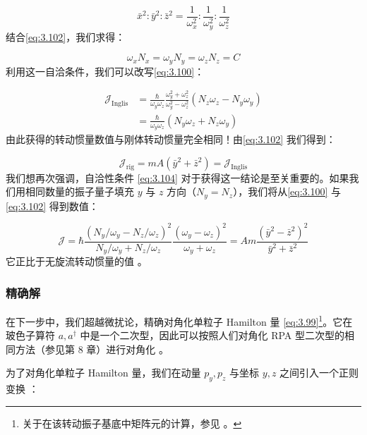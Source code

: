 \begin{equation}
\bar{x}^{2}:\bar{y}^{2}:\bar{z}^{2}=\frac{1}{\omega^{2}_{x}}:\frac{1}{\omega^{2}_{y}}:\frac{1}{\omega^{2}_{z}}\label{eq:3.103}
\end{equation}
结合\ref{eq:3.102}，我们求得：

\begin{equation}
\omega_{x}N_{x}=\omega_{y}N_{y}=\omega_{z}N_{z}=C\label{eq:3.104}
\end{equation}
利用这一自洽条件，我们可以改写\ref{eq:3.100}：

\begin{align}
\mathcal{J}_{\text{Inglis}} & =\frac{\hbar}{\omega_{y}\omega_{z}}\frac{\omega^{2}_{y}+\omega^{2}_{z}}{\omega^{2}_{y}-\omega^{2}_{z}}(N_{z}\omega_{z}-N_{y}\omega_{y})\nonumber \\
 & =\frac{\hbar}{\omega_{y}\omega_{z}}(N_{y}\omega_{z}+N_{z}\omega_{y})\label{eq:3.105}
\end{align}
由此获得的转动惯量数值与刚体转动惯量完全相同！由\ref{eq:3.102} 我们得到：

\begin{equation}
\mathcal{J}_{\text{rig}}=mA\left(\bar{y}^{2}+\bar{z}^{2}\right)=\mathcal{J}_{\text{Inglis}}\label{eq:3.106}
\end{equation}
我们想再次强调，自洽性条件 \ref{eq:3.104} 对于获得这一结论是至关重要的。如果我们用相同数量的振子量子填充 $y$
与 $z$ 方向（$N_{y}=N_{z}$），我们将从\ref{eq:3.100} 与 \ref{eq:3.102} 得到数值：

\begin{equation}
\mathcal{J}=\hbar\frac{(N_{y}/\omega_{y}-N_{z}/\omega_{z})^{2}}{N_{y}/\omega_{y}+N_{z}/\omega_{z}}\frac{(\omega_{y}-\omega_{z})^{2}}{\omega_{y}+\omega_{z}}=Am\frac{(\bar{y}^{2}-\bar{z}^{2})^{2}}{\bar{y}^{2}+\bar{z}^{2}}\label{eq:3.107}
\end{equation}
它正比于无旋流转动惯量的值 \cite{BM75}。

\subsubsection{精确解}

在下一步中，我们超越微扰论，精确对角化单粒子 Hamilton 量 \ref{eq:3.99}\footnote{关于在该转动振子基底中矩阵元的计算，参见 \cite{LR77}。}。它在玻色子算符
$a,a^{\dagger}$ 中是一个二次型，因此可以按照人们对角化 RPA 型二次型的相同方法（参见第 8 章）进行对角化 \cite{RBK75}。

为了对角化单粒子 Hamilton 量，我们在动量 $p_{y},p_{z}$ 与坐标 $y,z$ 之间引入一个正则变换 \cite{Va56}：


